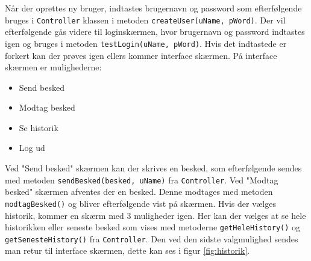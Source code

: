\newline
Når der oprettes ny bruger, indtastes brugernavn og password som efterfølgende bruges i \texttt{Controller} klassen i metoden \texttt{createUser(uName, pWord)}. Der vil efterfølgende gås videre til loginskærmen, hvor brugernavn og password indtastes igen og bruges i metoden \texttt{testLogin(uName, pWord)}. Hvis det indtastede er forkert kan der prøves igen ellers kommer interface skærmen.
\newline
På interface skærmen er mulighederne:
\begin{itemize}
	\item Send besked
	\item Modtag besked
	\item Se historik 
	\item Log ud
\end{itemize}
Ved "Send besked" skærmen kan der skrives en besked, som efterfølgende sendes med metoden \texttt{sendBesked(besked, uName)} fra \texttt{Controller}. Ved "Modtag besked" skærmen afventes der en besked. Denne modtages med metoden \texttt{modtagBesked()} og bliver efterfølgende vist på skærmen.
\newline
Hvis der vælges historik, kommer en skærm med 3 muligheder igen. Her kan der vælges at se hele historikken eller seneste besked som vises med metoderne \texttt{getHeleHistory()} og \texttt{getSenesteHistory()} fra \texttt{Controller}. Den ved den sidste valgmulighed sendes man retur til interface skærmen, dette kan ses i figur \ref{fig:historik}.

